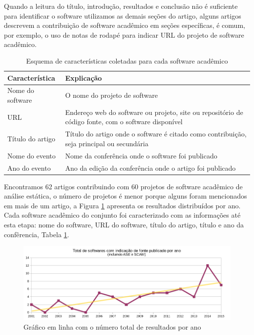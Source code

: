 Quando a leitura do título, introdução, resultados e conclusão não é suficiente
para identificar o software utilizamos as demais seções do artigo, alguns
artigos descrevem a contribuição de software acadêmico em seções específicas, é
comum, por exemplo, o uso de notas de rodapé para indicar URL do projeto de
software acadêmico.

\begin{table}[h]
\caption{Esquema de características coletadas para cada software acadêmico}
\centering
\begin{tabular}{ l p{11cm} }
  \hline
  Característica           & Explicação \\
  \hline
  Nome do software         & O nome do projeto de software \\
  URL                      & Endereço web do software ou projeto, site ou repositório de código fonte, com o software disponível \\
  Título do artigo         & Título do artigo onde o software é citado como contribuição, seja principal ou secundária \\
  Nome do evento           & Nome da conferência onde o software foi publicado \\
  Ano do evento            & Ano da edição da conferência onde o artigo foi publicado \\
  \hline
\end{tabular}
\label{coding-scheme-software-1}
\end{table}

Encontramos 62 artigos contribuindo com 60 projetos de software acadêmico de
análise estática, o número de projetos é menor porque alguns foram mencionados
em mais de um artigo, a Figura \ref{softwares-por-ano} apresenta os resultados
distribuídos por ano. Cada software acadêmico do conjunto foi caracterizado com
as informações até esta etapa: nome do software, URL do software, título do
artigo, título e ano da confêrencia, Tabela \ref{coding-scheme-software-1}.

\begin{figure}[h]
  \center
  \includegraphics[scale=0.65]{imagens/softwares-por-ano.png}
  \caption{Gráfico em linha com o número total de resultados por ano}
  \label{softwares-por-ano}
\end{figure}

